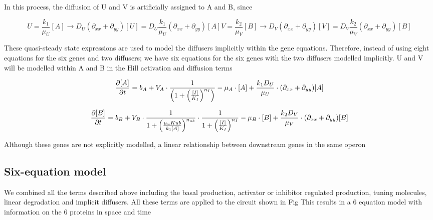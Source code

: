 In this process, the diffusion of U and V is artificially assigned to A and B, since

\begin{subequations}\label{[diffuser_artificial]}

\begin{equation}
    U = \frac{k_{1}}{ \mu_{U}}[A] \longrightarrow D_{U} (\partial_{xx} + \partial_{yy})[U] = D_{U}\frac{k_{1}}{ \mu_{U}}  (\partial_{xx} + \partial_{yy}) [A]\label{eq:equation2}
\end{equation}

\begin{equation}
    V = \frac{k_{2}}{ \mu_{V}}[B] \longrightarrow D_{V} (\partial_{xx} + \partial_{yy})[V] =  D_{V}\frac{k_{2}}{ \mu_{V}}  (\partial_{xx} + \partial_{yy}) [B]\label{eq:equation}
\end{equation}

\end{subequations}

These quasi-steady state expressions are used to model the diffusers implicitly within the gene equations.
Therefore, instead of using eight equations for the six genes and two diffusers; we have six equations for the six genes with the two diffusers modelled implicitly.
U and V will be modelled within A and B in the Hill activation and diffusion terms

\begin{equation}
    \pdv{[A]}{t} = b_{A}+V_{A}\cdot \frac{1}{\left(1+\left(\frac{[I]}{K_{I}}\right)^{n_{I}}\right)}-\mu_{A}\cdot[A] + \frac{ k_{1}D_{U}}{ \mu_{U}}\cdot (\partial_{xx} + \partial_{yy})[A]
\end{equation}

\begin{equation}
    \pdv{[B]}{t} = b_{B}+V_{B}\cdot\frac{1}{1+\left(\frac{\mu_{u}K{ub}}{k_{1}[A]}\right)^{n_{ab}}}\cdot\frac{1}{1+\left(\frac{[I]}{K_{I}}\right)^{n_{I}}}-\mu_{B}\cdot[B] + \frac{ k_{2}D_{V}}{ \mu_{V}}\cdot (\partial_{xx} + \partial_{yy})[B]
\end{equation}

Although these genes are not explicitly modelled, a linear relationship between downstream genes in the same operon
\subsection{Six-equation model}
We combined all the terms described above including the basal production, activator or inhibitor regulated production, tuning molecules, linear degradation and implicit diffusers.
All these terms are applied to the circuit shown in Fig %
This results in a 6 equation model with information on the 6 proteins in space and time


